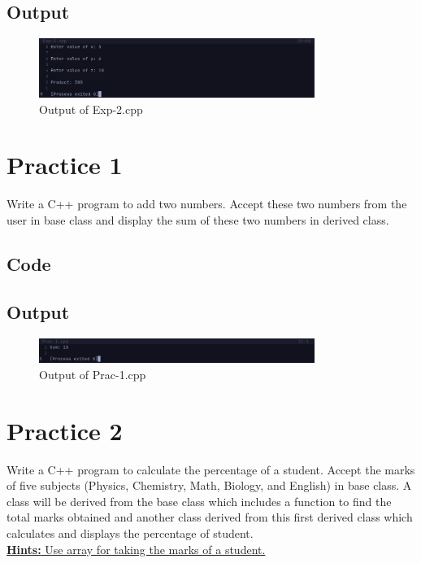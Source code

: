 \documentclass[12pt]{article}
\begin{document}
\subsection*{Output}
\begin{figure}[htpb]
    \centering
    \includegraphics[width=0.8\textwidth]{Exp-2.png}
    \caption{Output of Exp-2.cpp}
\end{figure}


\FloatBarrier
\section*{Practice 1}
Write a C++ program to add two numbers. Accept these two numbers from the user in base class and display the sum of these two numbers in derived class.

\subsection*{Code}


\subsection*{Output}
\begin{figure}[htpb]
    \centering
    \includegraphics[width=0.8\textwidth]{Prac-1.png}
    \caption{Output of Prac-1.cpp}
\end{figure}


\FloatBarrier
\section*{Practice 2}
Write a C++ program to calculate the percentage of a student. Accept the marks of five subjects (Physics, Chemistry, Math, Biology, and English) in base class. A class will be derived from the base class which includes a function to find the total marks obtained and another class derived from this first derived class which calculates and displays the percentage of student. \\ 
\underline{\textbf{Hints:} Use array for taking the marks of a student.}
\end{document}
